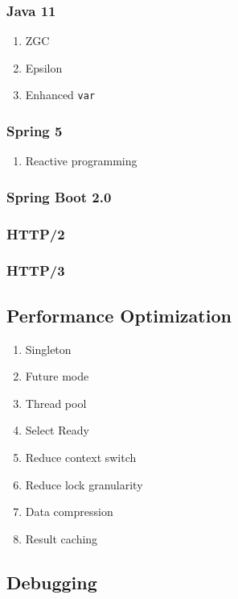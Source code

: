 \documentclass[11pt, twocolumn]{article}
\begin{document}
\subsubsection{Java 11}
\begin{enumerate}
	\item ZGC
	\item Epsilon
	\item Enhanced \texttt{var}
\end{enumerate}

\subsubsection{Spring 5}
\begin{enumerate}
	\item Reactive programming
\end{enumerate}

\subsubsection{Spring Boot 2.0}

\subsubsection{HTTP/2}

\subsubsection{HTTP/3}

\subsection{Performance Optimization}
\begin{enumerate}
	\item Singleton
	\item Future mode
	\item Thread pool
	\item Select Ready
	\item Reduce context switch
	\item Reduce lock granularity
	\item Data compression
	\item Result caching
\end{enumerate}

\subsection{Debugging}
\end{document}
